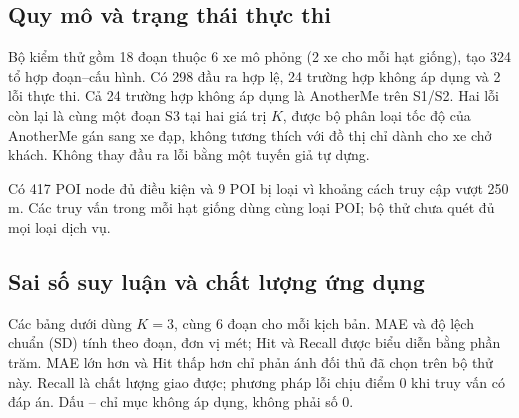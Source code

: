 

\subsection{Quy mô và trạng thái thực thi}

Bộ kiểm thử gồm 18 đoạn thuộc 6 xe mô phỏng (2 xe cho mỗi hạt giống), tạo 324 tổ hợp đoạn--cấu hình. Có 298 đầu ra hợp lệ, 24 trường hợp không áp dụng và 2 lỗi thực thi. Cả 24 trường hợp không áp dụng là AnotherMe trên S1/S2. Hai lỗi còn lại là cùng một đoạn S3 tại hai giá trị $K$, được bộ phân loại tốc độ của AnotherMe gán sang xe đạp, không tương thích với đồ thị chỉ dành cho xe chở khách. Không thay đầu ra lỗi bằng một tuyến giả tự dựng.

Có 417 POI node đủ điều kiện và 9 POI bị loại vì khoảng cách truy cập vượt 250 m. Các truy vấn trong mỗi hạt giống dùng cùng loại POI; bộ thử chưa quét đủ mọi loại dịch vụ.

\subsection{Sai số suy luận và chất lượng ứng dụng}

Các bảng dưới dùng $K=3$, cùng 6 đoạn cho mỗi kịch bản. MAE và độ lệch chuẩn (SD) tính theo đoạn, đơn vị mét; Hit và Recall được biểu diễn bằng phần trăm. MAE lớn hơn và Hit thấp hơn chỉ phản ánh đối thủ đã chọn trên bộ thử này. Recall là chất lượng giao được; phương pháp lỗi chịu điểm 0 khi truy vấn có đáp án. Dấu -- chỉ mục không áp dụng, không phải số 0.

